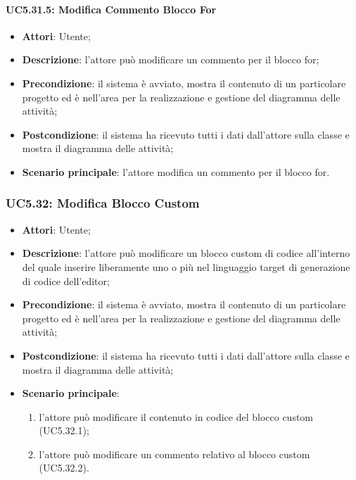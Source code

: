 \paragraph{UC5.31.5: Modifica Commento Blocco For}
\label{UC5.31.5}
\begin{itemize}
	\item \textbf{Attori}: Utente;
	\item \textbf{Descrizione}: l'attore può modificare un commento per il blocco for;
	\item \textbf{Precondizione}: il sistema è avviato, mostra il contenuto di un particolare progetto ed è nell'area per la realizzazione e gestione del diagramma delle attività;
	\item \textbf{Postcondizione}: il sistema ha ricevuto tutti i dati dall'attore sulla classe e mostra il diagramma delle attività;
	\item \textbf{Scenario principale}: l'attore modifica un commento per il blocco for.
\end{itemize}

\subsubsection{UC5.32: Modifica Blocco Custom}
\label{UC5.32}
\begin{itemize}
	\item \textbf{Attori}: Utente;
	\item \textbf{Descrizione}: l'attore può modificare un blocco custom di codice all'interno del quale inserire liberamente uno o più  nel linguaggio target di generazione di codice dell'editor;
	\item \textbf{Precondizione}: il sistema è avviato, mostra il contenuto di un particolare progetto ed è nell'area per la realizzazione e gestione del diagramma delle attività;
	\item \textbf{Postcondizione}: il sistema ha ricevuto tutti i dati dall'attore sulla classe e mostra il diagramma delle attività;
	\item \textbf{Scenario principale}:
	\begin{enumerate}
		\item l'attore può modificare il contenuto in codice del blocco custom (UC5.32.1);
		\item l'attore può modificare un commento relativo al blocco custom (UC5.32.2).
	\end{enumerate}
\end{itemize}

